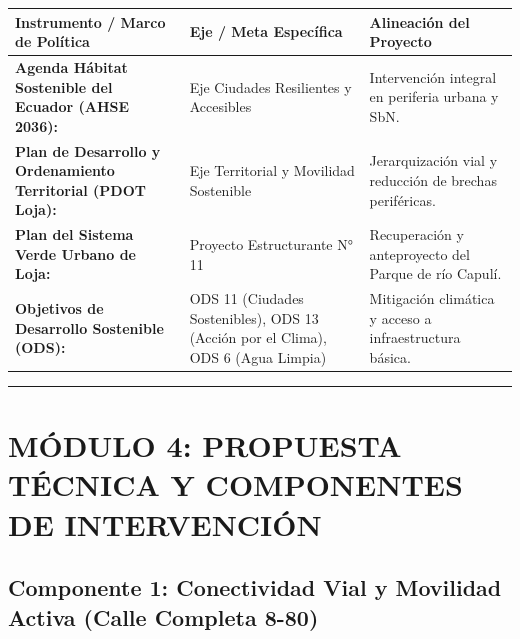 \documentclass[
  letterpaper,
  DIV=11,
  numbers=noendperiod]{scrreprt}
\newcounter{none} %
\begin{document}
{\def\LTcaptype{none} %
\begin{longtable}[]{@{}
  >{\raggedright\arraybackslash}p{}
  >{\raggedright\arraybackslash}p{}
  >{\raggedright\arraybackslash}p{}@{}}
\toprule\noalign{}
\begin{minipage}[b]{\linewidth}\raggedright
Instrumento / Marco de Política
\end{minipage} & \begin{minipage}[b]{\linewidth}\raggedright
Eje / Meta Específica
\end{minipage} & \begin{minipage}[b]{\linewidth}\raggedright
Alineación del Proyecto
\end{minipage} \\
\midrule\noalign{}
\endhead
\bottomrule\noalign{}
\endlastfoot
\textbf{Agenda Hábitat Sostenible del Ecuador (AHSE 2036):} & Eje
Ciudades Resilientes y Accesibles & Intervención integral en periferia
urbana y SbN. \\
\textbf{Plan de Desarrollo y Ordenamiento Territorial (PDOT Loja):} &
Eje Territorial y Movilidad Sostenible & Jerarquización vial y reducción
de brechas periféricas. \\
\textbf{Plan del Sistema Verde Urbano de Loja:} & Proyecto Estructurante
N° 11 & Recuperación y anteproyecto del Parque de río Capulí. \\
\textbf{Objetivos de Desarrollo Sostenible (ODS):} & ODS 11 (Ciudades
Sostenibles), ODS 13 (Acción por el Clima), ODS 6 (Agua Limpia) &
Mitigación climática y acceso a infraestructura básica. \\
\end{longtable}
}

\begin{center}\rule{0.5\linewidth}{0.5pt}\end{center}

\chapter{MÓDULO 4: PROPUESTA TÉCNICA Y COMPONENTES DE
INTERVENCIÓN}\label{muxf3dulo-4-propuesta-tuxe9cnica-y-componentes-de-intervenciuxf3n}

\section{Componente 1: Conectividad Vial y Movilidad Activa (Calle
Completa
8-80)}\label{componente-1-conectividad-vial-y-movilidad-activa-calle-completa-8-80}
\end{document}
